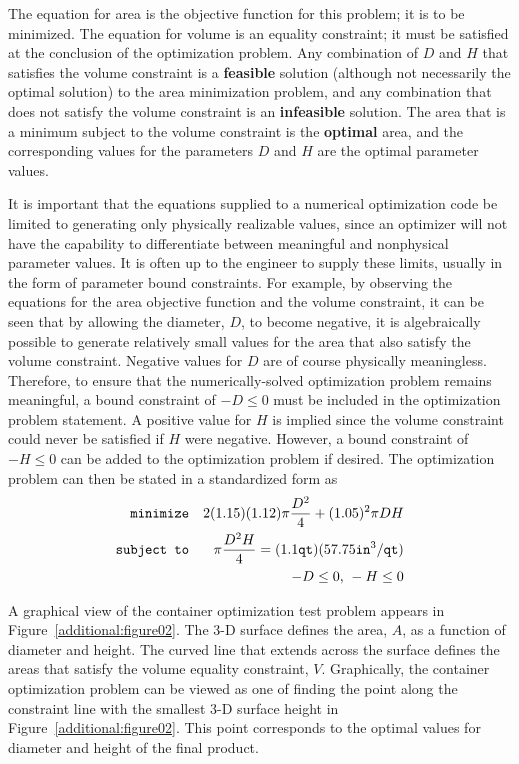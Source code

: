 The equation for area is the objective function for this problem; it
is to be minimized. The equation for volume is an equality constraint;
it must be satisfied at the conclusion of the optimization problem.
Any combination of $D$ and $H$ that satisfies the volume constraint is
a \textbf{feasible} solution (although not necessarily the optimal
solution) to the area minimization problem, and any combination that
does not satisfy the volume constraint is an \textbf{infeasible}
solution. The area that is a minimum subject to the volume constraint
is the \textbf{optimal} area, and the corresponding values for the
parameters $D$ and $H$ are the optimal parameter values.

It is important that the equations supplied to a numerical
optimization code be limited to generating only physically realizable
values, since an optimizer will not have the capability to
differentiate between meaningful and nonphysical parameter values. It
is often up to the engineer to supply these limits, usually in the
form of parameter bound constraints. For example, by observing the
equations for the area objective function and the volume constraint,
it can be seen that by allowing the diameter, $D$, to become negative,
it is algebraically possible to generate relatively small values for
the area that also satisfy the volume constraint. Negative values for
$D$ are of course physically meaningless. Therefore, to ensure that
the numerically-solved optimization problem remains meaningful, a
bound constraint of $-D \leq 0$ must be included in the optimization
problem statement. A positive value for $H$ is implied since the
volume constraint could never be satisfied if $H$ were negative.
However, a bound constraint of $-H \leq 0$ can be added to the
optimization problem if desired. The optimization problem can then be
stated in a standardized form as
\begin{eqnarray}
\texttt{minimize}   & & 2(1.15)(1.12)\pi\frac{D^2}{4}+(1.05)^2\pi DH\nonumber\\
\texttt{subject to} & & \pi\frac{D^2H}{4}=
  (1.1\mathtt{qt})(57.75 \mathtt{in}^3/\mathtt{qt}) \label{additional:contFH}\\
                    & & -D \leq 0\hbox{, }-H \leq 0\nonumber
\end{eqnarray}

A graphical view of the container optimization test problem appears in
Figure~\ref{additional:figure02}. The 3-D surface defines the area,
$A$, as a function of diameter and height. The curved line that
extends across the surface defines the areas that satisfy the volume
equality constraint, $V$. Graphically, the container optimization
problem can be viewed as one of finding the point along the constraint
line with the smallest 3-D surface height in
Figure~\ref{additional:figure02}. This point corresponds to the
optimal values for diameter and height of the final product.

